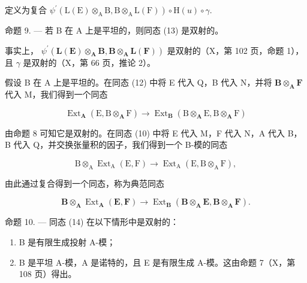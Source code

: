 定义为复合 \(\psi^{\prime}(\mathrm{L}(\mathrm{E})\otimes_{\mathrm{A}}\mathrm{B},\mathrm{B}\otimes_{\mathrm{A}}\mathrm{L}(\mathrm{F}))\circ \mathrm{H}(u)\circ \gamma .\)

命题 9. --- 若 B 在 A 上是平坦的，则同态 (13) 是双射的。

事实上， \(\psi^{\prime}(\mathbf{L}(\mathbf{E})\otimes_{\mathbf{A}}\mathbf{B},\mathbf{B}\otimes_{\mathbf{A}}\mathbf{L}(\mathbf{F}))\) 是双射的（X，第 102 页，命题 1），且 \(\gamma\) 是双射的（X，第 66 页，推论 2）。

假设 B 在 A 上是平坦的。在同态 (12) 中将 E 代入 Q，B 代入 N，并将 \(\mathbf{B} \otimes_{\mathbf{A}} \mathbf{F}\) 代入 M，我们得到一个同态

\[
\operatorname{Ext} _ {\mathbf {A}} \left(\mathrm{E}, \mathrm{B} \otimes_ {\mathbf {A}} \mathrm{F}\right)\rightarrow \operatorname{Ext} _ {\mathbf {B}} \left(\mathrm{B} \otimes_ {\mathbf {A}} \mathrm{E}, \mathrm{B} \otimes_ {\mathbf {A}} \mathrm{F}\right)
\]

由命题 8 可知它是双射的。在同态 (10) 中将 E 代入 M，F 代入 N，A 代入 B，B 代入 Q，并交换张量积的因子，我们得到一个 B-模的同态

\[
\mathrm{B} \otimes_ {\mathrm{A}} \operatorname{Ext} _ {\mathrm{A}} (\mathrm{E}, \mathrm{F}) \rightarrow \operatorname{Ext} _ {\mathrm{A}} (\mathrm{E}, \mathrm{B} \otimes_ {\mathrm{A}} \mathrm{F}),
\]

由此通过复合得到一个同态，称为典范同态

\[
\mathbf {B} \otimes_ {\mathbf {A}} \operatorname{Ext} _ {\mathbf {A}} (\mathbf {E}, \mathbf {F}) \rightarrow \operatorname{Ext} _ {\mathbf {B}} (\mathbf {B} \otimes_ {\mathbf {A}} \mathbf {E}, \mathbf {B} \otimes_ {\mathbf {A}} \mathbf {F}).\tag{14}
\]

命题 10. --- 同态 (14) 在以下情形中是双射的：

\begin{enumerate}
\def\labelenumi{\alph{enumi})}
\item
  B 是有限生成投射 A-模；
\item
  B 是平坦 A-模，A 是诺特的，且 E 是有限生成 A-模。这由命题 7（X，第 108 页）得出。
\end{enumerate}

